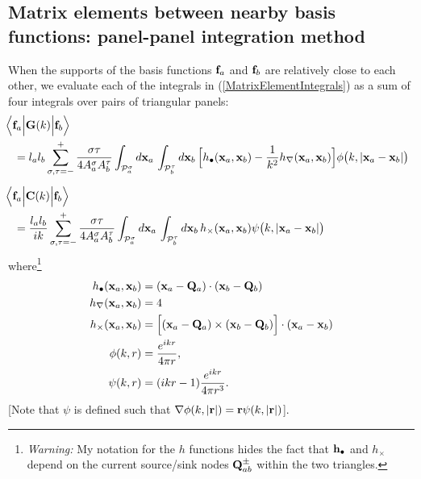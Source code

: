 \documentclass[dvips,letterpaper]{article}
\begin{document}

\subsection{Matrix elements between nearby basis functions: 
            panel-panel integration method}

When the supports of the basis functions $\mathbf{f}_a$ and $\mathbf{f}_b$ 
are relatively close to each other, we evaluate each of the 
integrals in (\ref{MatrixElementIntegrals}) as a sum of four
integrals over pairs of triangular panels: 
\begin{subequations}
\begin{align}
&\hspace{-0.1in}
 \Big\langle \vb f_a \Big| \vb G(k) \Big | \vb f_b \Big \rangle
\nn
&=
  l_a l_b 
  \sum_{\sigma, \tau=-}^+ 
  \frac{\sigma\tau}{4A^\sigma_a A^\tau_b}
  \int_{\pan_a^\sigma}  d\vb x_a \,
  \int_{\pan_b^\tau}  d\vb x_b \,
   \Big[                 h_{\bullet}(\vb x_a, \vb x_b)
         - \frac{1}{k^2} h_{\nabla}(\vb x_a, \vb x_b)
   \Big]
   \phi\big(k, |\vb x_a - \vb x_b|\big)
\\[5pt]
&\hspace{-0.1in}
 \Big\langle \vb f_a \Big| \vb C(k) \Big | \vb f_b \Big \rangle
\nn
&=
  \frac{l_a l_b}{ik}
  \sum_{\sigma, \tau=-}^+ 
  \frac{\sigma \tau}{4A^\sigma_a A^\tau_b}
  \int_{\pan_a^\sigma}  d\vb x_a \,
  \int_{\pan_b^\tau}  d\vb x_b \,
   h_{\times}(\vb x_a, \vb x_b)
   \psi\big(k, |\vb x_a - \vb x_b|\big)
\end{align}
\label{PanelPanelIntegrals}
\end{subequations}
where\footnote{\textit{Warning:} My notation for the $h$ functions
hides the fact that $\mathbf{h}_\bullet$ and $h_\times$ depend on the current 
source/sink nodes $\mathbf{Q}_{ab}^\pm$ within the two triangles.}
\begin{align*}
h_{\bullet}(\mathbf{x}_a, \mathbf{x}_b)
&= (\mathbf{x}_a - \mathbf{Q}_a) \cdot (\mathbf{x}_b - \mathbf{Q}_b) 
\\
h_{\nabla}(\mathbf{x}_a, \mathbf{x}_b)
&= 4
\\
h_{\times}(\mathbf{x}_a, \mathbf{x}_b)
&=
\Big[ (\mathbf{x}_a - \mathbf{Q}_a) \times (\mathbf{x}_b - \mathbf{Q}_b) \Big]
      \cdot (\mathbf{x}_a - \mathbf{x}_b)
\\
\phi(k, r)&=\frac{e^{ikr}}{4\pi r}, 
\\
\psi(k, r)&=(ikr-1)\frac{e^{ikr}}{4\pi r^3}.
\end{align*}
[Note that $\psi$ is defined such that 
$\nabla \phi(k, |\mathbf{r}|) = \mathbf{r} \psi(k, |\mathbf{r}|)$].
\end{document}

